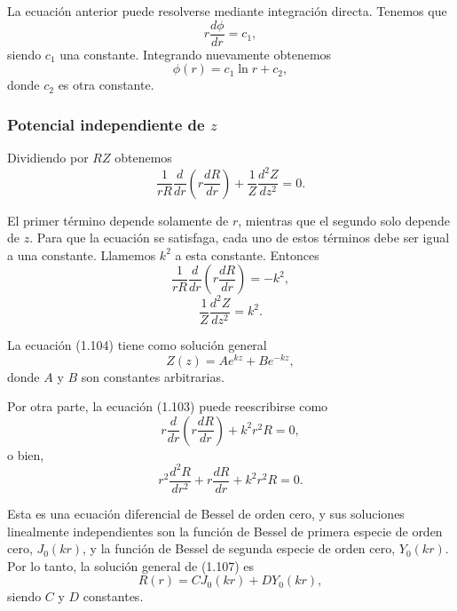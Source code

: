 \documentclass[12pt,a4paper]{book}
\begin{document}
La ecuación anterior puede resolverse mediante integración directa. Tenemos que
\begin{equation}
r\frac{d\phi}{dr} = c_1,
\end{equation}
siendo $c_1$ una constante. Integrando nuevamente obtenemos
\begin{equation}
\phi(r) = c_1\ln r + c_2,
\end{equation}
donde $c_2$ es otra constante.

\subsubsection{Potencial independiente de $z$}

Dividiendo por $RZ$ obtenemos
\begin{equation}
\frac{1}{rR}\frac{d}{dr}\left(r\frac{dR}{dr}\right) + \frac{1}{Z}\frac{d^2Z}{dz^2} = 0.
\end{equation}

El primer término depende solamente de $r$, mientras que el segundo solo depende de $z$. Para que la ecuación se satisfaga, cada uno de estos términos debe ser igual a una constante. Llamemos $k^2$ a esta constante. Entonces
\begin{equation}
\frac{1}{rR}\frac{d}{dr}\left(r\frac{dR}{dr}\right) = -k^2,
\end{equation}
\begin{equation}
\frac{1}{Z}\frac{d^2Z}{dz^2} = k^2.
\end{equation}

La ecuación (1.104) tiene como solución general
\begin{equation}
Z(z) = Ae^{kz} + Be^{-kz},
\end{equation}
donde $A$ y $B$ son constantes arbitrarias.

Por otra parte, la ecuación (1.103) puede reescribirse como
\begin{equation}
r\frac{d}{dr}\left(r\frac{dR}{dr}\right) + k^2r^2R = 0,
\end{equation}
o bien,
\begin{equation}
r^2\frac{d^2R}{dr^2} + r\frac{dR}{dr} + k^2r^2R = 0.
\end{equation}

Esta es una ecuación diferencial de Bessel de orden cero, y sus soluciones linealmente independientes son la función de Bessel de primera especie de orden cero, $J_0(kr)$, y la función de Bessel de segunda especie de orden cero, $Y_0(kr)$. Por lo tanto, la solución general de (1.107) es
\begin{equation}
R(r) = CJ_0(kr) + DY_0(kr),
\end{equation}
siendo $C$ y $D$ constantes.
\end{document}
